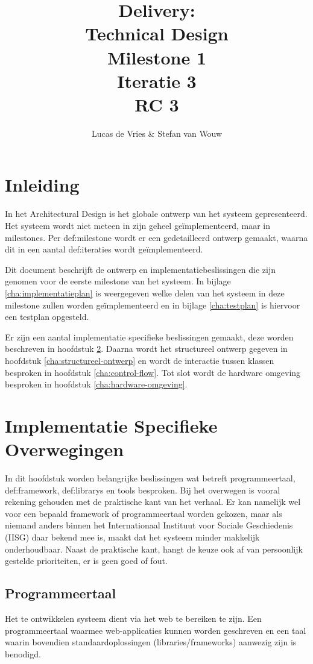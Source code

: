 \documentclass[a4paper,titlepage]{report}
\title{Delivery:\\Technical Design\\Milestone 1\\Iteratie 3\\RC 3}
\author{Lucas de Vries \& Stefan van Wouw}
\begin{document}
\maketitle


\setcounter{secnumdepth}{5}
\setcounter{tocdepth}{1}

\tableofcontents
\pagebreak
\chapter{Inleiding}
  In het Architectural Design is het globale ontwerp van het systeem
  gepresenteerd. Het systeem wordt niet meteen in zijn geheel ge\"implementeerd,
  maar in milestones. Per \gls{def:milestone} wordt er een gedetailleerd ontwerp gemaakt,
  waarna dit in een aantal \glspl{def:iteratie} wordt ge\"implementeerd.

  Dit document beschrijft de ontwerp en implementatiebeslissingen die zijn
  genomen voor de eerste milestone van het systeem. In bijlage
  \ref{cha:implementatieplan} is weergegeven welke delen van het systeem in deze
  milestone zullen worden ge\"implementeerd en in bijlage \ref{cha:testplan} is
  hiervoor een testplan opgesteld.

  Er zijn een aantal implementatie specifieke beslissingen gemaakt, deze worden
  beschreven in hoofdstuk \ref{cha:overwegingen}. Daarna wordt het structureel
  ontwerp gegeven in hoofdstuk \ref{cha:structureel-ontwerp} en wordt de
  interactie tussen klassen besproken in hoofdstuk \ref{cha:control-flow}. Tot
  slot wordt de hardware omgeving besproken in hoofdstuk
  \ref{cha:hardware-omgeving}.

\chapter{Implementatie Specifieke Overwegingen}
  \label{cha:overwegingen}
  In dit hoofdstuk worden belangrijke beslissingen wat betreft programmeertaal,
  \gls{def:framework}, \glspl{def:library} en tools besproken. Bij het overwegen
  is vooral rekening gehouden met de praktische kant van het verhaal. Er kan
  namelijk wel voor een bepaald framework of programmeertaal worden gekozen,
  maar als niemand anders binnen het Internationaal Instituut voor Sociale
  Geschiedenis (IISG) daar bekend mee is, maakt dat het systeem minder makkelijk
  onderhoudbaar. Naast de praktische kant, hangt de keuze ook af van persoonlijk
  gestelde prioriteiten, er is geen goed of fout.

  \section{Programmeertaal} 
    Het te ontwikkelen systeem dient via het web te bereiken te zijn. Een
    programmeertaal waarmee web-applicaties kunnen worden geschreven en een taal
    waarin bovendien standaardoplossingen (libraries/frameworks) aanwezig zijn
    is benodigd. 
\end{document}
